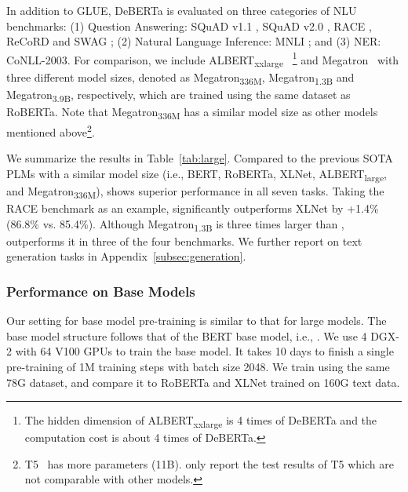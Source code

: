 In addition to GLUE, DeBERTa is evaluated on three categories of NLU benchmarks: 
(1) Question Answering: SQuAD v1.1 \citep{squad1}, SQuAD v2.0 \citep{squad2}, RACE \citep{lai2017race}, ReCoRD \citep{zhang2018record} and SWAG \citep{zellers2018swag}; 
(2) Natural Language Inference: MNLI \citep{mnli2018}; and 
(3) NER: CoNLL-2003.
For comparison, we include 
ALBERT\textsubscript{xxlarge}~\citep{lan2019albert}
\footnote{ The hidden dimension of ALBERT\textsubscript{xxlarge} is 4 times of DeBERTa and the computation cost is about 4 times of DeBERTa.} and 
Megatron~\citep{shoeybi2019megatron} with three different model sizes, denoted as Megatron\textsubscript{336M}, Megatron\textsubscript{1.3B} and Megatron\textsubscript{3.9B}, respectively, which are trained using the same dataset as RoBERTa. 
Note that Megatron\textsubscript{336M} has a similar model size as other models mentioned above\footnote{T5~\citep{raffel2019t5} has more parameters (11B). \cite{raffel2019t5} only report the test results of T5 which are not comparable with other models.}. 

We summarize the results in Table~{\ref{tab:large}}. 
Compared to the previous SOTA PLMs with a similar model size (i.e., BERT, RoBERTa, XLNet,  ALBERT\textsubscript{large}, and Megatron\textsubscript{336M}),  {\ModelName} shows superior performance in all seven tasks. 
Taking the RACE benchmark as an example, {\ModelName} significantly outperforms XLNet by +1.4\% (86.8\% vs. 85.4\%). 
Although Megatron\textsubscript{1.3B} is three times larger than {\ModelName}, {\ModelName} outperforms it in three of the four benchmarks. We further report {\ModelName} on text generation tasks in Appendix~\ref{subsec:generation}.


\subsubsection{Performance on Base Models}
Our setting for base model pre-training is similar to that for large models. 
The base model structure follows that of the BERT base model, i.e., . 
We use 4 DGX-2 with 64 V100 GPUs to train the base model. 
It takes 10 days to finish a single pre-training of 1M training steps with batch size 2048. 
We train {\ModelName} using the same 78G dataset, and compare it to RoBERTa and XLNet trained on 160G text data. 


